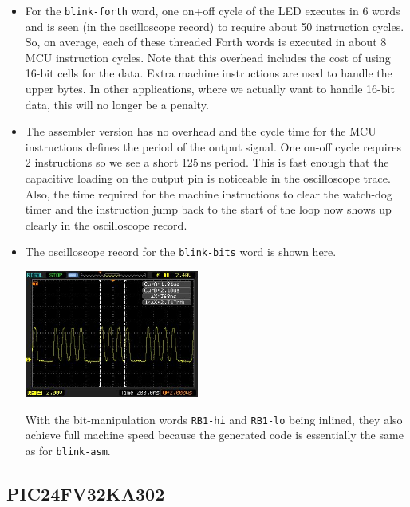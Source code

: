 \documentclass[12pt,a4paper]{article}
\begin{document}
\begin{itemize}
\begin{center}
  \end{center}
 \item For the \verb!blink-forth! word, one on+off cycle of the LED executes in 6 words
  and is seen (in the oscilloscope record) to require about 50 instruction cycles.
  So, on average, each of these threaded Forth words is executed in about 8 MCU instruction cycles. 
  Note that this overhead includes the cost of using 16-bit cells for the data.
  Extra machine instructions are used to handle the upper bytes.
  In other applications, where we actually want to handle 16-bit data, 
  this will no longer be a penalty.
 \item The assembler version has no overhead and the cycle time for the MCU
  instructions defines the period of the output signal.
  One on-off cycle requires 2 instructions so we see a short 125\,ns period.
  This is fast enough that the capacitive loading on the output pin 
  is noticeable in the oscilloscope trace.
  Also, the time required for the machine instructions to clear the watch-dog timer
  and the instruction jump back to the start of the loop 
  now shows up clearly in the oscilloscope record.
 \item The oscilloscope record for the \verb!blink-bits! word is shown here.
  \begin{center}
  \includegraphics[width=0.45\textwidth]{../figs/speed-test-named-bits-inlined-pic18f26k22.jpeg}
  \end{center}
  With the bit-manipulation words \verb!RB1-hi! and \verb!RB1-lo! being
  inlined, they also achieve full machine speed because the generated code is essentially
  the same as for \verb!blink-asm!.
\end{itemize}


\subsection{PIC24FV32KA302}
%
\end{document}
